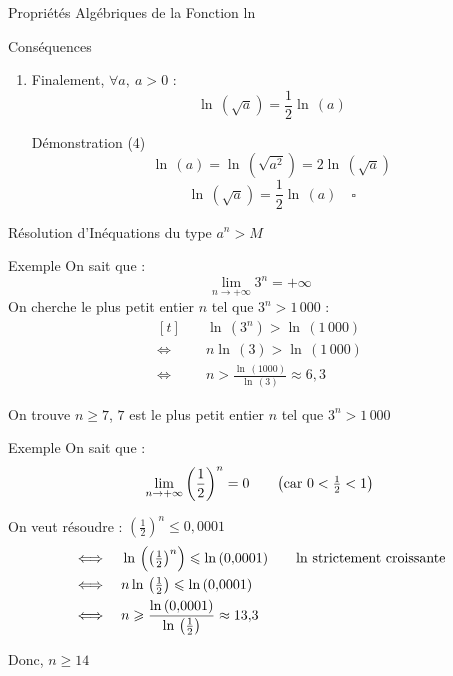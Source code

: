 \documentclass{cours}
\begin{document}
\begin{Gpartie}{Propriétés Algébriques de la Fonction ln}
\begin{Spartie}{Conséquences}
\begin{enumerate}[(1)]
\begin{SSpartie}{Démonstration (3)}
                \end{SSpartie}
                \item Finalement, $\forall a,~a>0$ :
                \[\ln\,\left(\sqrt{a}\right)=\frac{1}{2}\ln\,(a)\]
                \begin{SSpartie}{Démonstration (4)}
                    \[\ln\,(a)=\ln\,\left(\sqrt{a^2}\right)=2\ln\,\left(\sqrt{a}\right)\]
                    \[\ln\,\left(\sqrt{a}\right)=\frac{1}{2}\ln\,(a)\quad\square\]

                \end{SSpartie}
            \end{enumerate}
        \end{Spartie}
    \end{Gpartie}
    \begin{Gpartie}{Résolution d'Inéquations du type $a^n>M$}
        \vspace{-2ex}
        \begin{Spartie}{Exemple}
            On sait que : \[\lim_{n\to+\infty}3^n=+\infty\]
            On cherche le plus petit entier $n$ tel que $3^n>1\,000$ :
            \[\begin{aligned}[t]
                &\quad\ln\,\left(3^n\right)>\ln\,(1\,000) \\
                \iff&\quad n\ln\,(3)>\ln\,(1\,000) \\
                \iff&\quad n>\frac{\ln\,(1000)}{\ln\,(3)}\approx 6{,}3
            \end{aligned}\]

            On trouve $n\geq 7$, $7$ est le plus petit entier $n$ tel que $3^n>1\,000$
        \end{Spartie}
        \vspace{-2ex}
        \begin{Spartie}{Exemple}
            On sait que : \[\lim_{n\to+\infty}\left(\frac{1}{2}\right)^n=0\text{\qquad \big(car $0<\tfrac{1}{2}<1$\big)}\]
            
            On veut résoudre : $\left(\frac{1}{2}\right)^n\leq 0{,}0001$
            \[\begin{aligned}[t]
                \iff&\quad\ln\,\Big(\big(\tfrac{1}{2}\big)^n\Big)\leq\ln\,(0{,}0001)\text{\qquad $\ln$ strictement croissante} \\
                \iff&\quad n\ln\,\big(\tfrac{1}{2}\big)\leq\ln\,(0{,}0001) \\
                \iff&\quad n\geq\frac{\ln\,(0{,}0001)}{\ln\,\left(\frac{1}{2}\right)}\approx13{,}3
            \end{aligned}\]

            Donc, $n\geq 14$
        \end{Spartie}
    \end{Gpartie}
\end{document}
